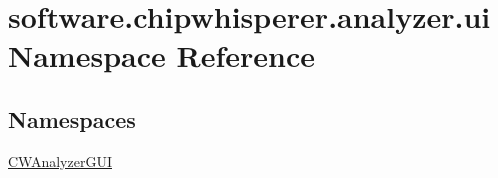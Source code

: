 \hypertarget{namespacesoftware_1_1chipwhisperer_1_1analyzer_1_1ui}{}\section{software.\+chipwhisperer.\+analyzer.\+ui Namespace Reference}
\label{namespacesoftware_1_1chipwhisperer_1_1analyzer_1_1ui}
\subsection*{Namespaces}
\begin{DoxyCompactItemize}
\item 
 \hyperlink{namespacesoftware_1_1chipwhisperer_1_1analyzer_1_1ui_1_1CWAnalyzerGUI}{C\+W\+Analyzer\+G\+U\+I}
\end{DoxyCompactItemize}
